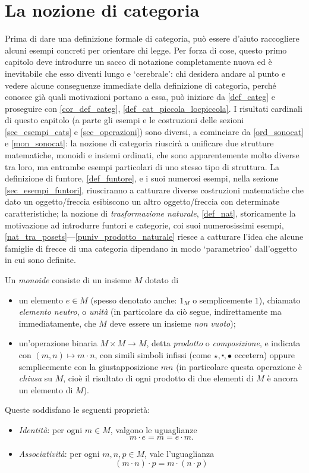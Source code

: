 \section{La nozione di categoria}\label{sec_categorie}

Prima di dare una definizione formale di categoria, può essere d'aiuto raccogliere alcuni esempi concreti per orientare chi legge. Per forza di cose, questo primo capitolo deve introdurre un sacco di notazione completamente nuova ed è inevitabile che esso diventi lungo e `cerebrale': chi desidera andare al punto e vedere alcune conseguenze immediate della definizione di categoria, perché conosce già quali motivazioni portano a essa, può iniziare da \ref{def_categ} e proseguire con \ref{cor_def_categ}, \ref{def_cat_piccola_locpiccola}. I risultati cardinali di questo capitolo (a parte gli esempi e le costruzioni delle sezioni \ref{sec_esempi_cats} e \ref{sec_operazioni}) sono diversi, a cominciare da \ref{ord_sonocat} e \ref{mon_sonocat}: la nozione di categoria riuscirà a unificare due strutture matematiche, monoidi e insiemi ordinati, che sono apparentemente molto diverse tra loro, ma entrambe esempi particolari di uno stesso tipo di struttura. La definizione di funtore, \ref{def_funtore}, e i suoi numerosi esempi, nella sezione \ref{sec_esempi_funtori}, riusciranno a catturare diverse costruzioni matematiche che dato un oggetto/freccia esibiscono un altro oggetto/freccia con determinate caratteristiche; la nozione di \emph{trasformazione naturale}, \ref{def_nat}, storicamente la motivazione ad introdurre funtori e categorie, coi suoi numerosissimi esempi, \ref{nat_tra_posets}---\ref{puniv_prodotto_naturale} riesce a catturare l'idea che alcune famiglie di frecce di una categoria dipendano in modo `parametrico' dall'oggetto in cui sono definite.
\begin{definition}\label{prelim_def_monoide}
 Un \emph{monoide} consiste di un insieme \(M\) dotato di
 \begin{itemize}
  \item un elemento \(e\in M\) (spesso denotato anche: \(1_M\) o semplicemente \(1\)), chiamato \emph{elemento neutro}, o \emph{unità} (in particolare da ciò segue, indirettamente ma immediatamente, che \(M\) deve essere un insieme \emph{non vuoto});
  \item un'operazione binaria \(M\times M\to M\), detta \emph{prodotto} o \emph{composizione}, e indicata con \((m,n)\mapsto m\cdot n\), con simili simboli infissi (come \(\star, \centerdot,\bullet\) eccetera) oppure semplicemente con la giustapposizione	\(mn\) (in particolare questa operazione è \emph{chiusa} su \(M\), cioè il risultato di ogni prodotto di due elementi di \(M\) è ancora un elemento di \(M\)).
 \end{itemize}
 Queste soddisfano le seguenti proprietà:
 \begin{itemize}
  \item \emph{Identità}: per ogni \(m\in M\), valgono le uguaglianze
        \[m\cdot e = m = e\cdot m.\]
  \item \emph{Associatività}: per ogni \(m,n,p\in M\), vale l'uguaglianza
        \[(m\cdot n)\cdot p = m\cdot (n\cdot p)\]
 \end{itemize}
\end{definition}
